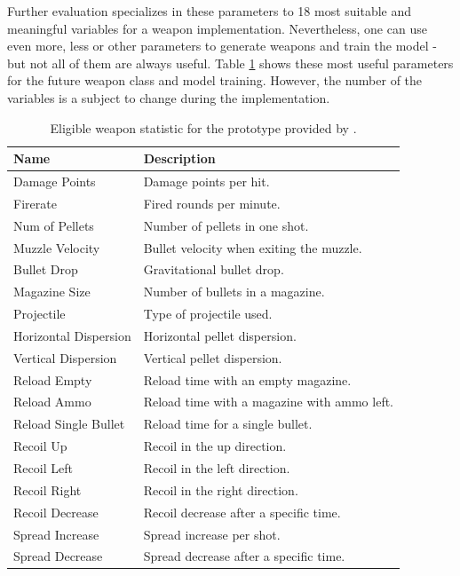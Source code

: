 \documentclass[MGS,Master,english]{twbook}%
\begin{document}
Further evaluation specializes in these parameters to 18 most suitable and meaningful variables for a weapon implementation. Nevertheless, one can use even more, less or other parameters to generate weapons and train the model - but not all of them are always useful. Table \ref{battlefield::weaponStats} shows these most useful parameters for the future weapon class and model training. However, the number of the variables is a subject to change during the implementation.
\begin{table}[!ht]
	\centering
	\begin{tabular}{|l|l|}
		\hline
		\textbf{Name}         & \textbf{Description}                         \\ \hline\hline
		Damage Points         & Damage points per hit.                       \\ \hline
		Firerate              & Fired rounds per minute.                     \\ \hline
		Num of Pellets        & Number of pellets in one shot.               \\ \hline
		Muzzle Velocity       & Bullet velocity when exiting the muzzle.     \\ \hline
		Bullet Drop           & Gravitational bullet drop.                   \\ \hline
		Magazine Size         & Number of bullets in a magazine.             \\ \hline
		Projectile            & Type of projectile used.                     \\ \hline
		Horizontal Dispersion & Horizontal pellet dispersion.                \\ \hline
		Vertical Dispersion   & Vertical pellet dispersion.                  \\ \hline
		Reload Empty          & Reload time with an empty magazine.          \\ \hline
		Reload Ammo           & Reload time with a magazine with ammo left. \\ \hline
		Reload Single Bullet  & Reload time for a single bullet.             \\ \hline
		Recoil Up             & Recoil in the up direction.                      \\ \hline
		Recoil Left           & Recoil in the left direction.                    \\ \hline
		Recoil Right          & Recoil in the right direction.                   \\ \hline
		Recoil Decrease       & Recoil decrease after a specific time.       \\ \hline
		Spread Increase       & Spread increase per shot.                    \\ \hline
		Spread Decrease       & Spread decrease after a specific time.       \\ \hline
	\end{tabular}
	\caption{Eligible weapon statistic for the prototype provided by \protect\cite{symthic::bf1stats}.}
	\label{battlefield::weaponStats}
\end{table}
\end{document}
